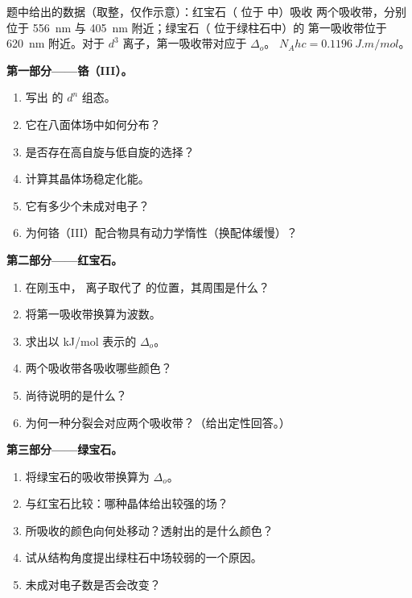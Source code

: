 \begin{problem}
\label{pb:b2:ligand-field:1}
题中给出的数据（取整，仅作示意）：红宝石（ 位于  中）吸收
两个吸收带，分别位于 \qty{556}{nm} 与 \qty{405}{nm} 附近；绿宝石（ 位于绿柱石中）的
第一吸收带位于 \qty{620}{nm} 附近。对于 $d^3$ 离子，第一吸收带对应于
$\Delta_o$。 $N_Ahc = \qty{0.1196}{J.m/mol}$。

\medskip
\noindent\textbf{第一部分——铬（III）。}
\begin{enumerate}
  \item 写出  的 $d^n$ 组态。
  \item 它在八面体场中如何分布？
  \item 是否存在高自旋与低自旋的选择？
  \item 计算其晶体场稳定化能。
  \item 它有多少个未成对电子？
  \item 为何铬（III）配合物具有动力学惰性（换配体缓慢）？
\end{enumerate}

\medskip
\noindent\textbf{第二部分——红宝石。}
\begin{enumerate}[resume]
  \item 在刚玉中， 离子取代了  的位置，其周围是什么？
  \item 将第一吸收带换算为波数。
  \item 求出以 \unit{kJ/mol} 表示的 $\Delta_o$。
  \item 两个吸收带各吸收哪些颜色？
  \item 尚待说明的是什么？
  \item 为何一种分裂会对应两个吸收带？（给出定性回答。）
\end{enumerate}

\medskip
\noindent\textbf{第三部分——绿宝石。}
\begin{enumerate}[resume]
  \item 将绿宝石的吸收带换算为 $\Delta_o$。
  \item 与红宝石比较：哪种晶体给出较强的场？
  \item 所吸收的颜色向何处移动？透射出的是什么颜色？
  \item 试从结构角度提出绿柱石中场较弱的一个原因。
  \item 未成对电子数是否会改变？
\end{enumerate}


\end{problem}
